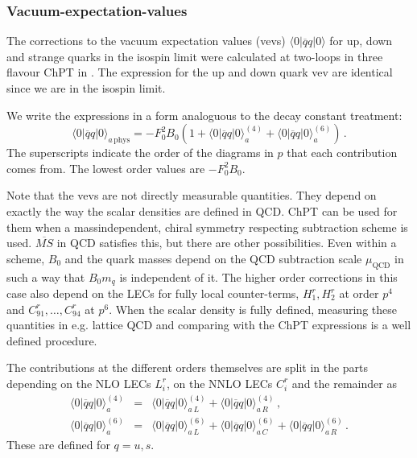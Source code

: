 \documentclass[12pt,a4paper]{article}
\begin{document}
\subsubsection{Vacuum-expectation-values}
\label{vevs}

The corrections to the vacuum expectation values (vevs)
$\langle0\vert \overline q q \vert 0\rangle$
for up, down and strange quarks in the isospin limit
were  calculated at two-loops in three flavour ChPT
in \cite{Amoros:2000mc}.
The expression for the up and down quark vev are identical since we
are in the isospin limit.

We write the expressions in a form analoguous to the decay constant
treatment:
\begin{equation}
\langle0\vert \overline q q \vert 0\rangle_{a\,\mathrm{phys}} =
- F_0^2 B_0\left(1+\langle0\vert \overline q q \vert 0\rangle_a^{(4)}+
\langle0\vert \overline q q \vert 0\rangle_a^{(6)}\right)\,.
\end{equation}
The superscripts indicate the order of the diagrams in $p$ that each
contribution comes from. The lowest order values are $-F_0^2 B_0$.

Note that the vevs are not directly measurable quantities. They depend
on exactly the way the scalar densities are defined in QCD. ChPT can be
used for them when a massindependent, chiral symmetry respecting subtraction
scheme is used. $\overline{MS}$ in QCD satisfies this, but there are other
possibilities. Even within a scheme, $B_0$ and the quark masses depend
on the QCD subtraction scale $\mu_\textrm{QCD}$ in such a way that
$B_0 m_q$ is independent of it. The higher order corrections in this
case also depend on the LECs for fully local counter-terms,
$H_1^r,H_2^r$ at order $p^4$ and $C_{91}^r,\ldots,C_{94}^r$ at $p^6$.
When the scalar density is fully defined, measuring these quantities in
e.g. lattice QCD and comparing with the ChPT expressions is a well defined
procedure.

The contributions at the different orders themselves are split in the parts
depending on the NLO LECs $L_i^r$, on the NNLO LECs $C_i^r$ and the
remainder as
\begin{eqnarray}
\label{defvev}
\langle0\vert \overline q q \vert 0\rangle_a^{(4)}&=&
\langle0\vert \overline q q \vert 0\rangle_{a\,L}^{(4)}
+\langle0\vert \overline q q \vert 0\rangle_{a\,R}^{(4)}\,,
\nonumber\\
\langle0\vert \overline q q \vert 0\rangle_a^{(6)}&=&
\langle0\vert \overline q q \vert 0\rangle_{a\,L}^{(6)}
+\langle0\vert \overline q q \vert 0\rangle_{a\,C}^{(6)}
+\langle0\vert \overline q q \vert 0\rangle_{a\,R}^{(6)}\,.
\end{eqnarray}
These are defined for $q=u,s$.\\
\end{document}
